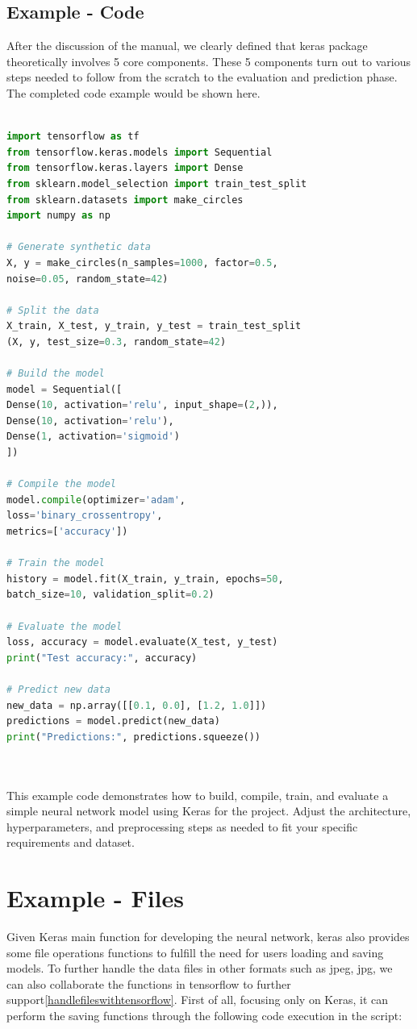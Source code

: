 \subsection{Example - Code}
	
	After the discussion of the manual, we clearly defined that keras package theoretically involves 5 core components. These 5 components turn out to various steps needed to follow from the scratch to the evaluation and prediction phase. The completed code example would be shown here. 
	
	\begin{lstlisting}[language=python]
		
import tensorflow as tf
from tensorflow.keras.models import Sequential
from tensorflow.keras.layers import Dense
from sklearn.model_selection import train_test_split
from sklearn.datasets import make_circles
import numpy as np

# Generate synthetic data
X, y = make_circles(n_samples=1000, factor=0.5,
noise=0.05, random_state=42)

# Split the data
X_train, X_test, y_train, y_test = train_test_split
(X, y, test_size=0.3, random_state=42)

# Build the model
model = Sequential([
Dense(10, activation='relu', input_shape=(2,)),
Dense(10, activation='relu'),
Dense(1, activation='sigmoid')
])

# Compile the model
model.compile(optimizer='adam',
loss='binary_crossentropy',
metrics=['accuracy'])

# Train the model
history = model.fit(X_train, y_train, epochs=50,
batch_size=10, validation_split=0.2)

# Evaluate the model
loss, accuracy = model.evaluate(X_test, y_test)
print("Test accuracy:", accuracy)

# Predict new data
new_data = np.array([[0.1, 0.0], [1.2, 1.0]])
predictions = model.predict(new_data)
print("Predictions:", predictions.squeeze())
		
		
	\end{lstlisting}


This example code demonstrates how to build, compile, train, and evaluate a simple neural network model using Keras for the project. Adjust the architecture, hyperparameters, and preprocessing steps as needed to fit your specific requirements and dataset.


	\section{Example - Files}
Given Keras main function for developing the neural network, keras also provides some file operations functions to fulfill the need for users loading and saving models. To further handle the data files in other formats such as jpeg, jpg, we can also collaborate the functions in tensorflow to further support\ref{handlefileswithtensorflow}. First of all, focusing only on Keras, it can perform the saving functions through the following code execution in the script:

